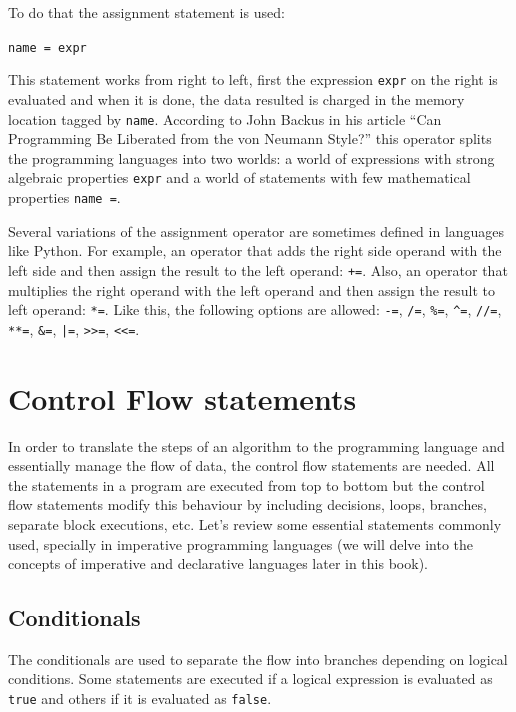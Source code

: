 To do that the assignment statement is used: 

\texttt{name = expr}
 
This statement works from right to left, first the expression \texttt{expr} on the right is evaluated and
when it is done, the data resulted is charged in the memory location tagged by \texttt{name}.
According to John Backus in his article ``Can Programming Be Liberated from the von Neumann Style?'' 
this operator splits the programming languages into two worlds: 
a world of expressions with strong algebraic properties \texttt{expr} and 
a world of statements with few mathematical properties \texttt{name =}.

Several variations of the assignment operator are sometimes defined in languages like Python. 
For example, 
an operator that adds the right side operand with the left side and then assign the result to the left operand: \texttt{+=}.
Also, an operator that multiplies the right operand with the left operand and then assign the result to left operand: \texttt{*=}.
Like this, the following options are allowed: \texttt{-=}, \texttt{/=}, \texttt{\%=}, \texttt{\^{}=}, \texttt{//=}, \texttt{**=}, \texttt{\&=}, \texttt{|=}, \texttt{>>=}, \texttt{<<=}. 





    \newpage
    \section{Control Flow statements}
In order to translate the steps of an algorithm to the programming language 
and essentially manage the flow of data, the control flow statements are needed. 
All the statements in a program are executed from top to bottom but 
the control flow statements modify this behaviour by including decisions, 
loops, branches, separate block executions, etc.
Let's review some essential statements commonly used, 
specially in imperative programming languages 
(we will delve into the concepts of imperative and declarative languages later in this book).


        \subsection{Conditionals}
        \vspace{-0.3cm}
        The conditionals are used to separate the flow into branches depending on logical conditions. 
        Some statements are executed if a logical expression is evaluated as \texttt{true} and others if it is evaluated as \texttt{false}.
        
